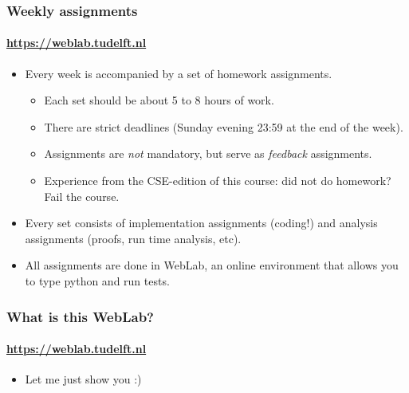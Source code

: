 \begin{frame}
	\frametitle{Weekly assignments}
	\framesubtitle{\url{https://weblab.tudelft.nl}}

	\begin{itemize}
		\item Every week is accompanied by a set of homework assignments.
			\begin{itemize}
				\item Each set should be about 5 to 8 hours of work.
				\item There are strict deadlines (Sunday evening 23:59 at the end of the week).
				\item Assignments are \textit{not} mandatory, but serve as \textit{feedback} assignments.
				\item Experience from the CSE-edition of this course: did not do homework? Fail the course.
			\end{itemize}
		\item Every set consists of implementation assignments (coding!) and analysis assignments (proofs, run time
			analysis, etc).
		\item All assignments are done in WebLab, an online environment that allows you to type python and run tests.
	\end{itemize}
\end{frame}

\begin{frame}
	\frametitle{What is this WebLab?}
	\framesubtitle{\url{https://weblab.tudelft.nl}}

	\begin{itemize}
		\item Let me just show you :)
	\end{itemize}
\end{frame}

